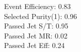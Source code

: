Event Efficiency:   0.83\\ 
Selected Purity(1): 0.96\\ 
Passed Jet S/T:     0.95\\ 
Passed Jet MR:      0.02\\ 
Passed Jet Eff:     0.24